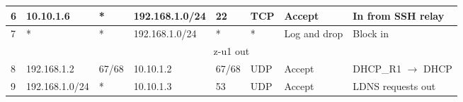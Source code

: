 \documentclass[a4paper, 11pt, oneside]{article}
\begin{document}
\begin{table}[H]
{\begin{tabular}{|llllllll|}
\multicolumn{1}{|l|}{6}                         & \multicolumn{1}{l|}{10.10.1.6}                                                    & \multicolumn{1}{l|}{*}                                                              & \multicolumn{1}{l|}{192.168.1.0/24}                                                    & \multicolumn{1}{l|}{22}                                                                  & \multicolumn{1}{l|}{TCP}               & \multicolumn{1}{l|}{Accept}          & In from SSH relay                      \\ \hline
\multicolumn{1}{|l|}{7}                         & \multicolumn{1}{l|}{*}                                                            & \multicolumn{1}{l|}{*}                                                              & \multicolumn{1}{l|}{192.168.1.0/24}                                                    & \multicolumn{1}{l|}{*}                                                                   & \multicolumn{1}{l|}{*}                 & \multicolumn{1}{l|}{Log and drop}    & Block in                               \\ \hline
\multicolumn{8}{|c|}{{\color[HTML]{FE0000} z-u1 out}}                                                                                                                                                                                                                                                                                                                                                                                                                                                                                  \\ \hline
\multicolumn{1}{|l|}{8}                         & \multicolumn{1}{l|}{192.168.1.2}                                                  & \multicolumn{1}{l|}{67/68}                                                          & \multicolumn{1}{l|}{10.10.1.2}                                                         & \multicolumn{1}{l|}{67/68}                                                               & \multicolumn{1}{l|}{UDP}               & \multicolumn{1}{l|}{Accept}          & DHCP\_R1 $\rightarrow$ DHCP            \\ \hline
\multicolumn{1}{|l|}{9}                         & \multicolumn{1}{l|}{192.168.1.0/24}                                               & \multicolumn{1}{l|}{*}                                                              & \multicolumn{1}{l|}{10.10.1.3}                                                         & \multicolumn{1}{l|}{53}                                                                  & \multicolumn{1}{l|}{UDP}               & \multicolumn{1}{l|}{Accept}          & LDNS requests out                      \\ \hline

\end{tabular}}
\end{table}
\end{document}
